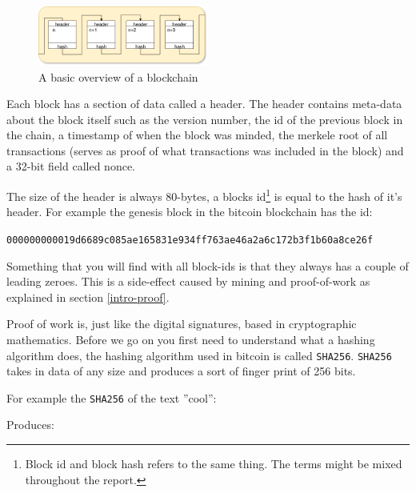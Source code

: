\begin{figure}[H]
	\centering
	\includegraphics[width=0.5\textwidth]{introduction/images/blockchain.png}
	\caption{A basic overview of a blockchain}
	\label{fig:blockchain}
\end{figure}

Each block has a section of data called a header. The header contains meta-data 
about the block itself such as the version number, the id of the previous block 
in the chain, a timestamp of when the block was minded, the merkele root of 
all transactions (serves as proof of what transactions was included in the block) 
and a 32-bit field called nonce. 

The size of the header is always 80-bytes, a blocks id\footnote{Block id and 
block hash refers to the same thing. The terms might be mixed throughout the report.} 
is equal to the hash of it's header. For example the genesis block in the 
bitcoin blockchain has the id:

\texttt{000000000019d6689c085ae165831e934ff763ae46a2a6c172b3f1b60a8ce26f}

Something that you will find with all block-ids is that they always has a couple 
of leading zeroes. This is a side-effect  caused by mining and proof-of-work 
as explained in section \ref{intro-proof}.

\label{intro-proof}
Proof of work is, just like the digital signatures, based in cryptographic
mathematics. Before we go on you first need to understand what a hashing
algorithm does, the hashing algorithm used in bitcoin is called \texttt{SHA256}.
\texttt{SHA256} takes in data of any size and produces a sort of finger print
of 256 bits.

For example the \texttt{SHA256} of the text ''cool'':


Produces:


